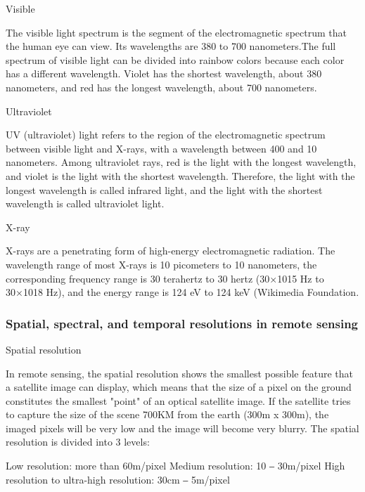 \documentclass[conference]{IEEEtran}
\newcommand{\subparagraph}{}
\begin{document}
	\subparagraph{Visible}
	
	The visible light spectrum is the segment of the electromagnetic spectrum that the human eye can view. Its wavelengths are 
	380 to 700 nanometers.The full spectrum of visible light can be divided into rainbow colors because each color has a different 
	wavelength. Violet has the shortest wavelength, about 380 nanometers, and red has the longest wavelength, about 700 nanometers\cite{Vis73:online}.
 
	\subparagraph{Ultraviolet}
	
	UV (ultraviolet) light refers to the region of the electromagnetic spectrum between visible light and X-rays, with a wavelength 
	between 400 and 10 nanometers. Among ultraviolet rays, red is the light with the longest wavelength, and violet is the light 
	with the shortest wavelength. Therefore, the light with the longest wavelength is called infrared light, and the light with the 
	shortest wavelength is called ultraviolet light\cite{uvlight14:online}.

	\subparagraph{X-ray}
	
	X-rays are a penetrating form of high-energy electromagnetic radiation. The wavelength range of most X-rays is 10 picometers 
	to 10 nanometers, the corresponding frequency range is 30 terahertz to 30 hertz (30×1015 Hz to 30×1018 Hz), and the energy range 
	is 124 eV to 124 keV (Wikimedia Foundation\cite{XrayWiki61:online}.

	\subsubsection{Spatial, spectral, and temporal resolutions in remote sensing}
	
	\subparagraph{Spatial resolution} 
	
	In remote sensing, the spatial resolution shows the smallest possible feature that a satellite image can display, which means 
	that the size of a pixel on the ground constitutes the smallest "point" of an optical satellite image. If the satellite tries 
	to capture the size of the scene 700KM from the earth (300m x 300m), the imaged pixels will be very low and the image will become 
	very blurry\cite{AtlasAIW26:online}. The spatial resolution is divided into 3 levels:
	
	Low resolution: more than 60m/pixel
	Medium resolution: 10 ‒ 30m/pixel
	High resolution to ultra-high resolution: 30cm ‒ 5m/pixel
	
\end{document}
